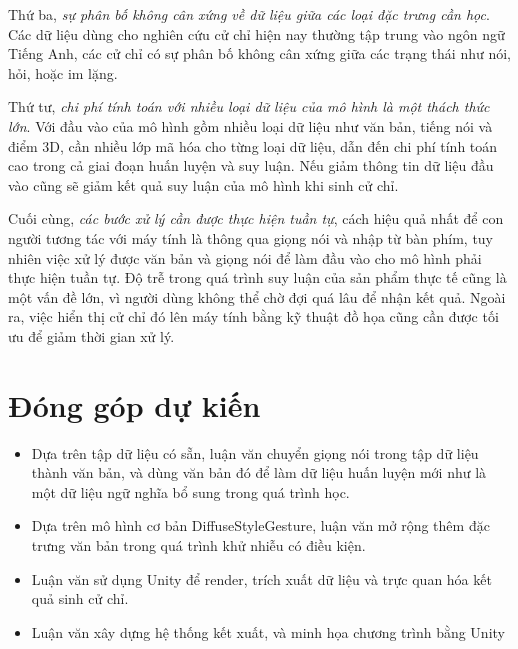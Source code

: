 Thứ ba, \textit{sự phân bố không cân xứng về  dữ liệu giữa các loại đặc trưng cần học}. Các dữ liệu dùng cho nghiên cứu cử chỉ hiện nay thường tập trung vào ngôn ngữ Tiếng Anh, các cử chỉ có sự phân bố không cân xứng giữa các trạng thái như nói, hỏi, hoặc im lặng.

Thứ tư, \textit{chi phí tính toán với nhiều loại dữ liệu của mô hình là một thách thức lớn}. Với đầu vào của mô hình gồm nhiều loại dữ liệu như văn bản, tiếng nói và điểm 3D, cần nhiều lớp mã hóa cho từng loại dữ liệu, dẫn đến chi phí tính toán cao trong cả giai đoạn huấn luyện và suy luận. Nếu giảm thông tin dữ liệu đầu vào cũng sẽ giảm kết quả suy luận của mô hình khi sinh cử chỉ.

Cuối cùng, \textit{các bước xử lý cần được thực hiện tuần tự}, cách hiệu quả nhất để con người tương tác với máy tính là thông qua giọng nói và nhập từ bàn phím, tuy nhiên việc xử lý được văn bản và giọng nói để làm đầu vào cho mô hình phải thực hiện tuần tự. Độ trễ trong quá trình suy luận của sản phẩm thực tế cũng là một vấn đề lớn, vì người dùng không thể chờ đợi quá lâu để nhận kết quả. Ngoài ra, việc hiển thị cử chỉ đó lên máy tính bằng kỹ thuật đồ họa cũng cần được tối ưu để giảm thời gian xử lý.


\section{Đóng góp dự kiến}

\begin{itemize}
	\item Dựa trên tập dữ liệu có sẵn, luận văn chuyển giọng nói trong tập dữ liệu thành văn bản, và dùng văn bản đó để làm dữ liệu huấn luyện mới như là một dữ liệu ngữ nghĩa bổ sung trong quá trình học.
	
	\item Dựa trên mô hình cơ bản DiffuseStyleGesture, luận văn mở rộng thêm đặc trưng văn bản trong quá trình khử nhiễu có điều kiện.
	
	\item Luận văn sử dụng Unity để render, trích xuất dữ liệu và trực quan hóa kết quả sinh cử chỉ.
	
	\item Luận văn xây dựng hệ thống kết xuất, và minh họa chương trình bằng Unity
\end{itemize}




